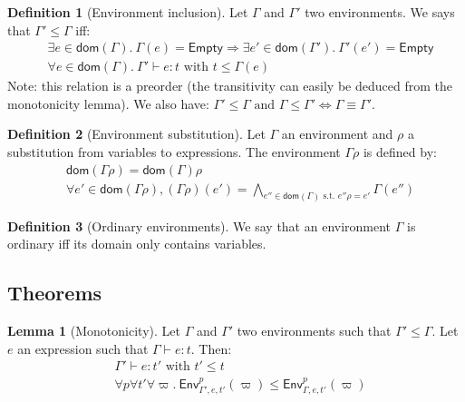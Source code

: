 \documentclass[a4paper]{article}%
\newcommand{\dom}[1]{\textsf{dom}(#1)}
\newcommand{\Empty} {\textsf{Empty}}%
\newcommand{\Gp}[2]{\textsf{Env}^{#1}_{#2}}
\theoremstyle{definition}
\newtheorem{lemma}{Lemma}
\newtheorem{definition}{Definition}
\begin{document}
  \begin{definition}[Environment inclusion]
    Let $\Gamma$ and $\Gamma'$ two environments. We says that $\Gamma' \leq \Gamma$ iff:
    \begin{align*}
      &\exists e\in \dom \Gamma.\ \Gamma(e)=\Empty \Rightarrow \exists e'\in \dom {\Gamma'}.\ \Gamma'(e')=\Empty\\
      &\forall e \in \dom \Gamma.\ \Gamma' \vdash e : t \text{ with } t \leq \Gamma(e)
    \end{align*}
    Note: this relation is a preorder (the transitivity can easily be deduced from the monotonicity lemma).
    We also have: $\Gamma' \leq \Gamma \text{ and } \Gamma \leq \Gamma' \Leftrightarrow \Gamma \equiv \Gamma'$.
  \end{definition}

  \begin{definition}[Environment substitution]
    Let $\Gamma$ an environment and $\rho$ a substitution from variables to expressions.
    The environment $\Gamma\rho$ is defined by:
    \begin{align*}
      &\dom {\Gamma\rho} = \dom \Gamma \rho\\
      &\forall e' \in \dom {\Gamma\rho}, (\Gamma\rho)(e') = \bigwedge_{e'' \in \dom \Gamma \text{ s.t. } e''\rho=e'}\Gamma(e'')
    \end{align*}
  \end{definition}

  \begin{definition}[Ordinary environments]
    We say that an environment $\Gamma$ is ordinary iff its domain only contains variables.
  \end{definition}

    \subsection{Theorems}

    \begin{lemma}[Monotonicity]
      Let $\Gamma$ and $\Gamma'$ two environments such that $\Gamma' \leq \Gamma$. Let $e$ an expression such that $\Gamma \vdash e:t$.
      Then:\\
      \begin{align*}
        &\Gamma' \vdash e:t' \text{ with } t' \leq t\\
        &\forall p \forall t' \forall \varpi.\ \Gp p {\Gamma',e,t'} (\varpi) \leq \Gp p {\Gamma,e,t'} (\varpi)
      \end{align*}
    \end{lemma}
\end{document}
